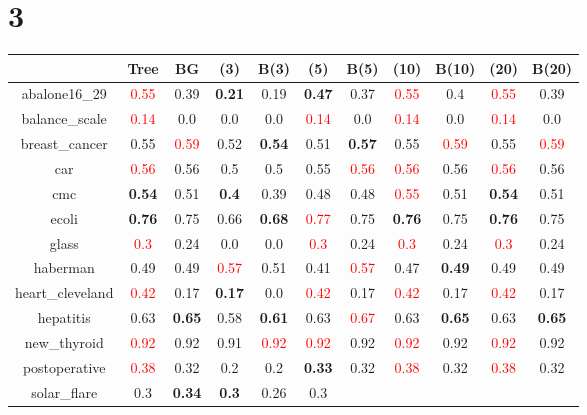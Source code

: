 \documentclass{article}%
\begin{document}
\section*{3}%
\begin{tabular}{c|cccccccccc}%
\hline%
&Tree&BG&(3)&B(3)&(5)&B(5)&(10)&B(10)&(20)&B(20)\\%
\hline%
abalone16\_29&\textcolor{red}{ 
0.55
}&0.39&\textbf{0.21}&0.19&\textbf{0.47}&0.37&\textcolor{red}{ 
0.55
}&0.4&\textcolor{red}{ 
0.55
}&0.39\\%
\hline%
balance\_scale&\textcolor{red}{ 
0.14
}&0.0&0.0&0.0&\textcolor{red}{ 
0.14
}&0.0&\textcolor{red}{ 
0.14
}&0.0&\textcolor{red}{ 
0.14
}&0.0\\%
\hline%
breast\_cancer&0.55&\textcolor{red}{ 
0.59
}&0.52&\textbf{0.54}&0.51&\textbf{0.57}&0.55&\textcolor{red}{ 
0.59
}&0.55&\textcolor{red}{ 
0.59
}\\%
\hline%
car&\textcolor{red}{ 
0.56
}&0.56&0.5&0.5&0.55&\textcolor{red}{ 
0.56
}&\textcolor{red}{ 
0.56
}&0.56&\textcolor{red}{ 
0.56
}&0.56\\%
\hline%
cmc&\textbf{0.54}&0.51&\textbf{0.4}&0.39&0.48&0.48&\textcolor{red}{ 
0.55
}&0.51&\textbf{0.54}&0.51\\%
\hline%
ecoli&\textbf{0.76}&0.75&0.66&\textbf{0.68}&\textcolor{red}{ 
0.77
}&0.75&\textbf{0.76}&0.75&\textbf{0.76}&0.75\\%
\hline%
glass&\textcolor{red}{ 
0.3
}&0.24&0.0&0.0&\textcolor{red}{ 
0.3
}&0.24&\textcolor{red}{ 
0.3
}&0.24&\textcolor{red}{ 
0.3
}&0.24\\%
\hline%
haberman&0.49&0.49&\textcolor{red}{ 
0.57
}&0.51&0.41&\textcolor{red}{ 
0.57
}&0.47&\textbf{0.49}&0.49&0.49\\%
\hline%
heart\_cleveland&\textcolor{red}{ 
0.42
}&0.17&\textbf{0.17}&0.0&\textcolor{red}{ 
0.42
}&0.17&\textcolor{red}{ 
0.42
}&0.17&\textcolor{red}{ 
0.42
}&0.17\\%
\hline%
hepatitis&0.63&\textbf{0.65}&0.58&\textbf{0.61}&0.63&\textcolor{red}{ 
0.67
}&0.63&\textbf{0.65}&0.63&\textbf{0.65}\\%
\hline%
new\_thyroid&\textcolor{red}{ 
0.92
}&0.92&0.91&\textcolor{red}{ 
0.92
}&\textcolor{red}{ 
0.92
}&0.92&\textcolor{red}{ 
0.92
}&0.92&\textcolor{red}{ 
0.92
}&0.92\\%
\hline%
postoperative&\textcolor{red}{ 
0.38
}&0.32&0.2&0.2&\textbf{0.33}&0.32&\textcolor{red}{ 
0.38
}&0.32&\textcolor{red}{ 
0.38
}&0.32\\%
\hline%
solar\_flare&0.3&\textbf{0.34}&\textbf{0.3}&0.26&0.3&\textcolor{red}{ 
}
\end{tabular}
\end{document}
